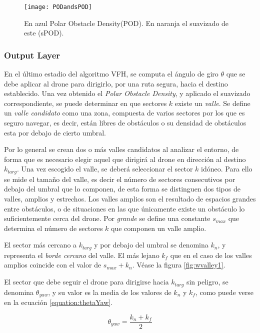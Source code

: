  \begin{figure}[H]
	\centering
	\texttt{[image: PODandsPOD]}
	\caption[POD vs smoothPOD.]{En azul Polar Obstacle Density(POD). En naranja el suavizado de este (sPOD).}\label{fig:PODandsPOD}
\end{figure}

\subsubsection{Output Layer}
\label{subsubsec:OL}
En el último estadio del algoritmo VFH, se computa el ángulo de giro $\theta$ que se debe aplicar al drone para dirigirlo, por una ruta segura, hacia el destino establecido.
Una vez obtenido el \textit{Polar Obstacle Density}, y aplicado el suavizado correspondiente, se puede determinar en que sectores $k$ existe un \textit{valle}. Se define un \textit{valle candidato} como una zona, compuesta de varios sectores por los que es seguro navegar, es decir, están libres de obstáculos o su densidad de obstáculos esta por debajo de cierto umbral. 

Por lo general se crean dos o más valles candidatos al analizar el entorno, de forma que es necesario elegir aquel que dirigirá al drone en dirección al destino $k_{targ}$. Una vez escogido el valle, se deberá seleccionar el sector $k$ idóneo. Para ello se mide el tamaño del valle, es decir el número de sectores consecutivos por debajo del umbral que lo componen, de esta forma se distinguen dos tipos de valles, amplios y estrechos. 
Los valles amplios son el resultado de espacios grandes entre obstáculos, o de situaciones en las que únicamente existe un obstáculo lo suficientemente cerca del drone. Por \textit{grande} se define una constante $s_{max}$ que determina el número de sectores $k$ que componen un valle amplio.

El sector más cercano a $k_{targ}$ y por debajo del umbral se denomina $k_n$, y representa el \textit{borde cercano} del valle. El más lejano $k_f$ que en el caso de los valles amplios coincide con el valor de $s_{max} + k_n$.  Véase la figura \ref{fig:wvalley1}.

El sector que debe seguir el drone para dirigirse hacia $k_{targ}$ sin peligro, se denomina $\theta_{yaw}$, y su valor es la media de los valores de $k_n$ y $k_f$, como puede verse en la ecuación \ref{equation:thetaYaw}.

\begin{equation}
\theta_{yaw} = \frac{k_n + k_f}{2}
\label{equation:thetaYaw}
\end{equation}


